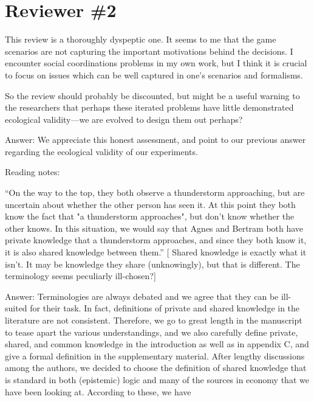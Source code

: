\documentclass[a4paper]{article}
\newenvironment{robin}{\smallskip \noindent \color{red!10!green!50!blue}}{\color{black}\smallskip}
\begin{document}
\section*{Reviewer \#2}
This review is a thoroughly dyspeptic one. It seems to me that the game scenarios are not capturing the important motivations behind the decisions. I encounter social coordinations problems in my own work, but I think it is crucial to focus on issues which can be well captured in one's scenarios and formalisms.

So the review should probably be discounted, but might be a useful warning to the researchers that perhaps these iterated problems have little demonstrated ecological validity---we are evolved to design them out perhaps?

\begin{robin} Answer: We appreciate this honest assessment, and point to our previous answer regarding the ecological validity of our experiments.
\end{robin}

Reading notes:

``On the way to the top, they both observe a thunderstorm approaching, but are uncertain about whether the other person has seen it. At this point they both know the fact that "a thunderstorm approaches", but don't know whether the other knows. In this situation, we would say that Agnes and Bertram both have private knowledge that a thunderstorm approaches, and since they both know it, it is also shared knowledge between them.''
[ Shared knowledge is exactly what it isn't. It may be knowledge they share (unknowingly), but that is different. The terminology seems peculiarly ill-chosen?]

\begin{robin} Answer: Terminologies are always debated and we agree that they can be ill-suited for their task. In fact, definitions of private and shared knowledge in the literature are not consistent. Therefore, we go to great length in the manuscript to tease apart the various understandings, and we also carefully define private, shared, and common knowledge in the introduction as well as in appendix C, and give a formal definition in the supplementary material. After lengthy discussions among the authors, we decided to choose the definition of shared knowledge that is standard in both (epistemic) logic and many of the sources in economy that we have been looking at. According to these, we have 
\end{robin}
\end{document}
